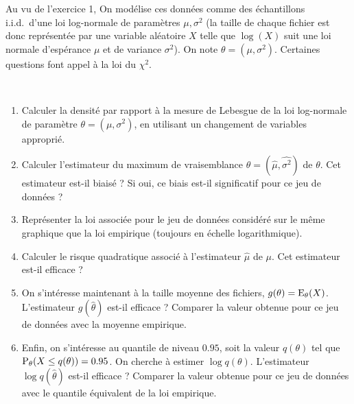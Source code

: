 \documentclass[11pt,a4paper,oneside]{article}
\begin{document}
Au vu de l'exercice 1,
On modélise ces données comme des échantillons i.i.d.~d'une loi log-normale de paramètres $\mu,\sigma^2$ (la taille  de chaque fichier est donc représentée par une variable aléatoire $X$   telle que $\log(X)$ suit une loi normale d'espérance $\mu$ et de variance $\sigma^2$). On note $\theta = (\mu,\sigma^2)$.
Certaines questions font appel à la loi du $\chi^2$. 
\begin{exercice}~

  \begin{enumerate}
\item Calculer la densité par rapport à la mesure de Lebesgue de la loi log-normale de paramètre $\theta=(\mu,\sigma^2)$, en utilisant un changement de variables approprié.
  
\item Calculer l'estimateur du maximum de vraisemblance $\hat \theta = (\hat \mu,\hat{\sigma^2})$ de $\theta$. Cet estimateur est-il biaisé ? Si oui, ce biais est-il significatif pour ce jeu de données ?

\item Représenter la loi associée pour le jeu de données considéré sur le même graphique que la loi empirique (toujours en échelle logarithmique).

\item Calculer le risque quadratique associé à l'estimateur $\hat \mu$ de $\mu$. Cet estimateur est-il efficace ?

\item On s'intéresse maintenant à la taille moyenne des fichiers, $g(\theta) = {\rm E}_\theta(X)$. L'estimateur $g(\hat \theta)$ est-il efficace ? Comparer la valeur obtenue pour ce jeu de données avec la moyenne empirique.
\item Enfin, on s'intéresse au quantile de niveau $0.95$, soit la valeur $q(\theta)$ tel que  ${\rm P}_\theta(X\le q(\theta)) = 0.95$. On cherche à estimer $\log q(\theta)$. L'estimateur $\log q(\hat \theta)$ est-il efficace ? Comparer la valeur obtenue pour ce jeu de données avec le quantile équivalent   de la loi empirique.

\end{enumerate}

\end{exercice}
\end{document}
